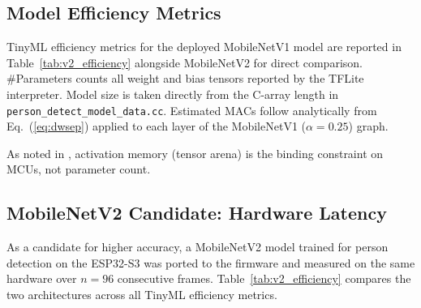 \documentclass[conference]{IEEEtran}
\begin{document}
\subsection{Model Efficiency Metrics}

TinyML efficiency metrics for the deployed MobileNetV1 model are
reported in Table~\ref{tab:v2_efficiency} alongside MobileNetV2
for direct comparison. \#Parameters counts all weight and bias
tensors reported by the TFLite interpreter. Model size is taken directly
from the C-array length in \texttt{person\_detect\_model\_data.cc}.
Estimated MACs follow analytically from Eq.~(\ref{eq:dwsep}) applied
to each layer of the MobileNetV1 ($\alpha{=}0.25$) graph.

As noted in \cite{mcunet}, activation memory (tensor arena) is the
binding constraint on MCUs, not parameter count.

\subsection{MobileNetV2 Candidate: Hardware Latency}

As a candidate for higher accuracy, a MobileNetV2 model trained for
person detection on the ESP32-S3 \cite{mobilenetv2esp32} was ported to
the firmware and measured on the same hardware over $n\!=\!96$
consecutive frames. Table~\ref{tab:v2_efficiency} compares the two
architectures across all TinyML efficiency metrics.

\begin{table}[h]
\centering
\caption{TinyML efficiency metrics: MobileNetV1 vs.\ MobileNetV2.
         V2 latency measured on-device ($n\!=\!96$ frames,
         \texttt{latency\_log.csv}).}
\label{tab:v2_efficiency}
\end{table}
\end{document}
